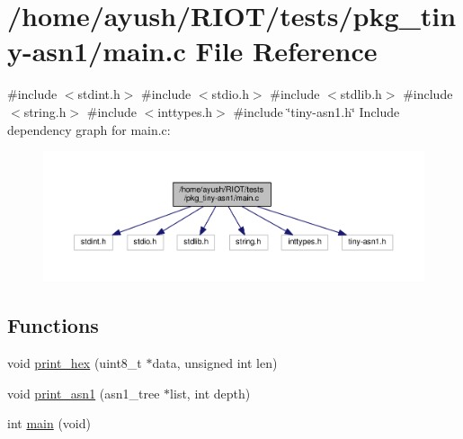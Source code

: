 \hypertarget{pkg__tiny-asn1_2main_8c}{}\section{/home/ayush/\+R\+I\+O\+T/tests/pkg\+\_\+tiny-\/asn1/main.c File Reference}
\label{pkg__tiny-asn1_2main_8c}
{\ttfamily \#include $<$stdint.\+h$>$}\newline
{\ttfamily \#include $<$stdio.\+h$>$}\newline
{\ttfamily \#include $<$stdlib.\+h$>$}\newline
{\ttfamily \#include $<$string.\+h$>$}\newline
{\ttfamily \#include $<$inttypes.\+h$>$}\newline
{\ttfamily \#include \char`\"{}tiny-\/asn1.\+h\char`\"{}}\newline
Include dependency graph for main.\+c\+:
\nopagebreak
\begin{figure}[H]
\begin{center}
\leavevmode
\includegraphics[width=350pt]{pkg__tiny-asn1_2main_8c__incl}
\end{center}
\end{figure}
\subsection*{Functions}
\begin{DoxyCompactItemize}
\item 
void \hyperlink{pkg__tiny-asn1_2main_8c_a58093ae00f094fd066daf0ce9d67d60d}{print\+\_\+hex} (uint8\+\_\+t $\ast$data, unsigned int len)
\item 
void \hyperlink{pkg__tiny-asn1_2main_8c_ae4f7d0f99310a055172c96821890edbe}{print\+\_\+asn1} (asn1\+\_\+tree $\ast$list, int depth)
\item 
int \hyperlink{pkg__tiny-asn1_2main_8c_a840291bc02cba5474a4cb46a9b9566fe}{main} (void)
\end{DoxyCompactItemize}


